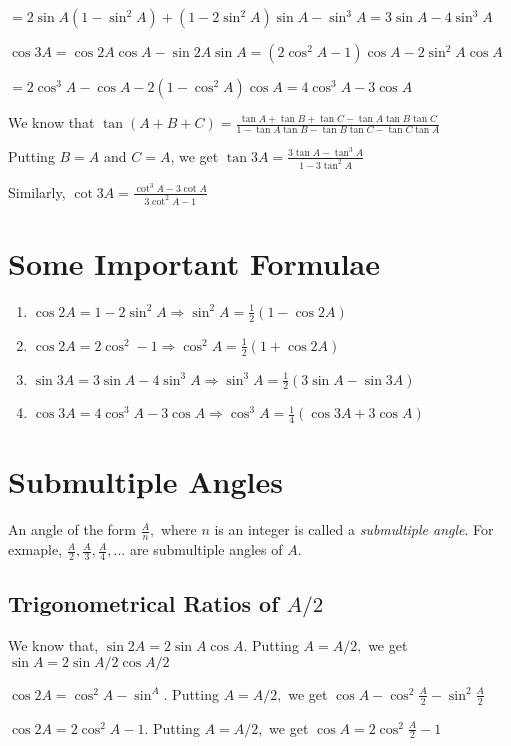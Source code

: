 \noindent $= 2\sin A(1 - \sin^2A) + (1 - 2\sin^2A)\sin A - \sin^3A = 3\sin A - 4\sin^3A$

\noindent $\cos 3A = \cos2A\cos A - \sin 2A\sin A = (2\cos^2A - 1)\cos A - 2\sin^2 A\cos A$

\noindent $= 2\cos^3A - \cos A - 2(1 - \cos^2A)\cos A = 4\cos^3 A - 3\cos A$

\noindent We know that $\tan(A + B + C) = \frac{\tan A + \tan B + \tan C - \tan A\tan B\tan C}{1 - \tan A\tan B - \tan B\tan C -
  \tan C\tan A}$

\noindent Putting $B = A$ and $C = A$, we get $\tan 3A = \frac{3\tan A - \tan^3A}{1 - 3\tan^2A}$

\noindent Similarly, $\cot 3A = \frac{\cot^3 A - 3\cot A}{3\cot^2A - 1}$

\section{Some Important Formulae}
\begin{enumerate}
  \item $\cos2A = 1 - 2\sin^2A \Rightarrow \sin^2A = \frac{1}{2}(1 - \cos2A)$
  \item $\cos2A = 2\cos^2 - 1 \Rightarrow \cos^2A = \frac{1}{2}(1 + \cos2A)$
  \item $\sin 3A = 3\sin A - 4\sin^3A \Rightarrow \sin^3A = \frac{1}{2}(3\sin A - \sin3A)$
  \item $\cos 3A = 4\cos^3A - 3\cos A \Rightarrow \cos^3A = \frac{1}{4}(\cos3A + 3\cos A)$
\end{enumerate}

\section{Submultiple Angles}
An angle of the form $\frac{A}{n},$ where $n$ is an integer is called a \textit{submultiple angle}. For exmaple,
$\frac{A}{2}, \frac{A}{3}, \frac{A}{4}, \ldots$ are submultiple angles of $A.$

\subsection{Trigonometrical Ratios of $A/2$}
We know that, $\sin 2A = 2\sin A\cos A.$ Putting $A=A/2,$ we get $\sin A = 2\sin A/2\cos A/2$

\noindent $\cos 2A = \cos^2A - \sin^A.$ Putting $A = A/2,$ we get $\cos A - \cos^2\frac{A}{2} - \sin^2\frac{A}{2}$

\noindent $\cos 2A = 2\cos^2A - 1.$ Putting $A = A/2,$ we get $\cos A = 2\cos^2\frac{A}{2} - 1$


